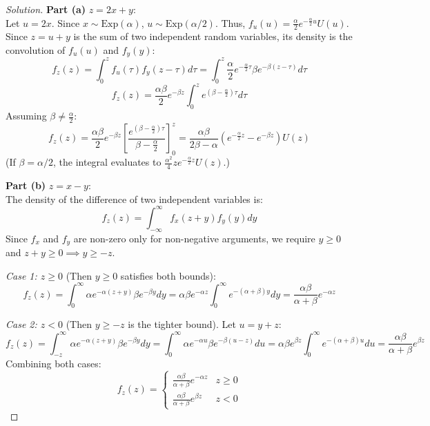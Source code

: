 \documentclass{article}
\begin{document}
\begin{proof}[Solution]
	\textbf{Part (a)} $z = 2x + y$: \\
	Let $u = 2x$. Since $x \sim \text{Exp}(\alpha)$, $u \sim \text{Exp}(\alpha/2)$. Thus, $f_u(u) = \frac{\alpha}{2} e^{-\frac{\alpha}{2} u} U(u)$.
	Since $z = u + y$ is the sum of two independent random variables, its density is the convolution of $f_u(u)$ and $f_y(y)$:
	\[
		f_z(z) = \int_{0}^{z} f_u(\tau) f_y(z - \tau) d\tau = \int_{0}^{z} \frac{\alpha}{2} e^{-\frac{\alpha}{2} \tau} \beta e^{-\beta(z - \tau)} d\tau
	\]
	\[
		f_z(z) = \frac{\alpha \beta}{2} e^{-\beta z} \int_{0}^{z} e^{(\beta - \frac{\alpha}{2}) \tau} d\tau
	\]
	Assuming $\beta \neq \frac{\alpha}{2}$:
	\[
		f_z(z) = \frac{\alpha \beta}{2} e^{-\beta z} \left[ \frac{e^{(\beta - \frac{\alpha}{2})\tau}}{\beta - \frac{\alpha}{2}} \right]_{0}^{z} = \frac{\alpha \beta}{2\beta - \alpha} \left( e^{-\frac{\alpha}{2} z} - e^{-\beta z} \right) U(z)
	\]
	(If $\beta = \alpha/2$, the integral evaluates to $\frac{\alpha^2}{4} z e^{-\frac{\alpha}{2} z} U(z)$.)
	
	\textbf{Part (b)} $z = x - y$: \\
	The density of the difference of two independent variables is:
	\[
		f_z(z) = \int_{-\infty}^{\infty} f_x(z+y) f_y(y) dy
	\]
	Since $f_x$ and $f_y$ are non-zero only for non-negative arguments, we require $y \ge 0$ and $z+y \ge 0 \implies y \ge -z$.
	
	\textit{Case 1: $z \ge 0$} (Then $y \ge 0$ satisfies both bounds):
	\[
		f_z(z) = \int_{0}^{\infty} \alpha e^{-\alpha(z+y)} \beta e^{-\beta y} dy = \alpha \beta e^{-\alpha z} \int_{0}^{\infty} e^{-(\alpha+\beta)y} dy = \frac{\alpha \beta}{\alpha+\beta} e^{-\alpha z}
	\]
	
	\textit{Case 2: $z < 0$} (Then $y \ge -z$ is the tighter bound). Let $u = y + z$:
	\[
		f_z(z) = \int_{-z}^{\infty} \alpha e^{-\alpha(z+y)} \beta e^{-\beta y} dy = \int_{0}^{\infty} \alpha e^{-\alpha u} \beta e^{-\beta(u-z)} du = \alpha \beta e^{\beta z} \int_{0}^{\infty} e^{-(\alpha+\beta)u} du = \frac{\alpha \beta}{\alpha+\beta} e^{\beta z}
	\]
	Combining both cases:
	\[
		f_z(z) = \begin{cases}
			\frac{\alpha \beta}{\alpha+\beta} e^{-\alpha z} & z \ge 0 \\
			\frac{\alpha \beta}{\alpha+\beta} e^{\beta z} & z < 0
		\end{cases}
	\]
\end{proof}

\vspace{1cm}
\end{document}
